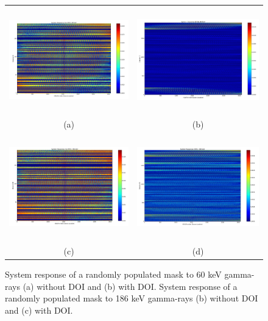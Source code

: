 \documentclass[10pt]{article}
\begin{document}
\begin{figure}[htb!]
\hypertarget{fig3}{}
\centering
\begin{tabular}{cc}
	\includegraphics[height=130pt]{Figures/SystemResponse_60_noDOI.png} & 
	\includegraphics[height=130pt]{Figures/SystemResponse_60_DOI.png} \\ [-0.5ex]
	\scriptsize{(a)} & \scriptsize{(b)} \\ [1ex]
	\includegraphics[height=130pt]{Figures/SystemResponse_186_noDOI.png} & 
	\includegraphics[height=130pt]{Figures/SystemResponse_186_DOI.png} \\ [-0.5ex]
	\scriptsize{(c)} & \scriptsize{(d)} \\[-5pt]
\end{tabular}
\caption{System response of a randomly populated mask to 60 keV gamma-rays (a) without DOI and (b) with DOI. System response of a randomly populated mask to 186 keV gamma-rays (b) without DOI and (c) with DOI.}
\end{figure}
\end{document}
